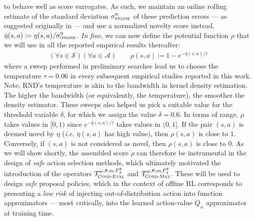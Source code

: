 to behave well as score surrogates.
As such, we maintain an online rolling estimate of the standard deviation
$\sigma^\eta_\textsc{online}$ of these prediction errors
--- as suggested originally in \cite{Burda2018-vl} ---
and use a normalized novelty score instead, $\bar{\eta}(s,a) \coloneqq \eta(s,a) / \sigma^\eta_\textsc{online}$.
\textit{In fine},
we can now define the potential function $\rho$ that we will use in all the reported empirical results thereafter:
\begin{align}
  (\forall s \in \mathcal{S})(\forall a \in \mathcal{A})
  \qquad
  \rho(s,a) \coloneqq 1 - e^{-\displaystyle\bar{\eta}(s,a)/\tau}
  \label{rhodef}
\end{align}
where a sweep performed in preliminary searches lead us to choose the temperature $\tau=0.06$ in every
subsequent empirical studies reported in this work.
Note, RND's temperature is akin to the bandwidth in kernel density estimation.
The higher the bandwidth (or equivalently, the temperature), the smoother the density estimator.
These sweeps also helped us pick a suitable value for the threshold variable $\delta$,
for which we assign the value $\delta=0.6$.
In terms of range, $\rho$ takes values in $[0,1)$ since $e^{-\displaystyle\bar{\eta}(s,a)/\tau}$
takes values in $(0,1]$.
If the pair $(s,a)$ is deemed novel by $\eta$ (\textit{i.e.} $\bar{\eta}(s,a)$ has high value),
then $\rho(s,a)$ is close to $1$. Conversely, if $(s,a)$ is not considered as novel,
then $\rho(s,a)$ is close to $0$. As we will show shortly, the assembled score $\rho$ can therefore be
instrumental in the design of \textit{safe} action selection methods, which ultimately motivated the
introduction of the operators $\mathcal{T}_\textsc{Cond-Eval}^{\omega, \theta, m, \Gamma^\theta_\delta}$
and $\mathcal{T}_\textsc{Cond-Max}^{\omega, \theta, m, \Gamma^\theta_\delta}$.
These will be used to design \textit{safe} proposal policies, which in the context of offline RL
corresponds to presenting a \textit{low risk} of injecting out-of-distribution action
into function approximators --- most critically, into the learned action-value $Q_\omega$
approximator at training time.

